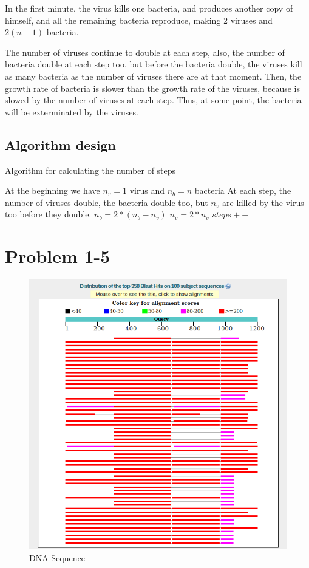 \documentclass{article}
\begin{document}
In the first minute, the virus kills one bacteria, and produces another copy of himself, and all the remaining bacteria reproduce, making $2$ viruses and $2(n-1)$ bacteria.

The number of viruses continue to double at each step, also, the number of bacteria double at each step too, but before the bacteria double, the viruses kill as many bacteria as the number of viruses there are at that moment. Then, the growth rate of bacteria is slower than the growth rate of the viruses, because is slowed by the number of viruses at each step. Thus, at some point, the bacteria will be exterminated by the viruses.

\subsection*{Algorithm design}

\begin{algorithm}[H]
\caption{Algorithm for calculating the number of steps}
\begin{algorithmic}[1]
\State At the beginning we have $n_v = 1$ virus and $n_b = n$ bacteria
\State At each step, the number of viruses double, the bacteria double too, but $n_v$ are killed by the virus too before they double.
 \State $n_b = 2*(n_b-n_v)$
 \State $n_v = 2*n_v$
 \State $steps++$
\EndWhile
\end{algorithmic}
\end{algorithm}

\section*{Problem 1-5}

\begin{figure}[H]
\begin{center}
\includegraphics[scale = .4]{Dinosaur}
\end{center}
\caption{DNA Sequence}
\end{figure}
\end{document}
